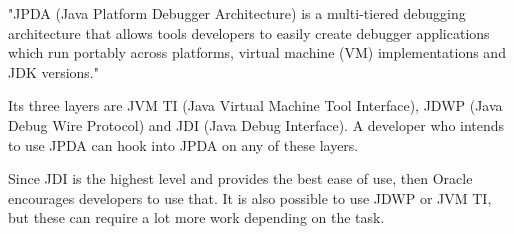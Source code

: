 \documentclass[..thesis.tex]{subfiles}
\begin{document}

"JPDA (Java Platform Debugger Architecture) is a multi-tiered debugging architecture that allows tools developers to easily create debugger applications which run portably across platforms, virtual machine (VM) implementations and JDK versions."\cite{oracle_jpda_spec} 

Its three layers are JVM TI (Java Virtual Machine Tool Interface), JDWP (Java Debug Wire Protocol) and JDI (Java Debug Interface). 
A developer who intends to use JPDA can hook into JPDA on any of these layers. \cite{oracle_jpda_spec} 

Since JDI is the highest level and provides the best ease of use, then Oracle encourages developers to use that.\cite{oracle_jpda_spec}
It is also possible to use JDWP or JVM TI, but these can require a lot more work depending on the task. 
\end{document}
